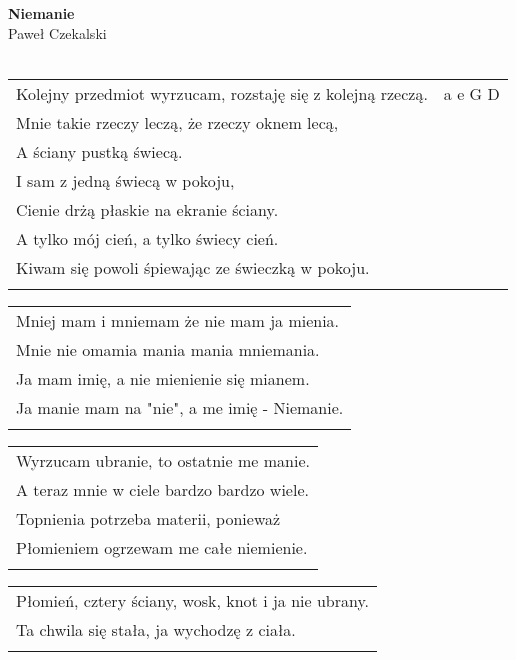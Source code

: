 \documentclass[a5paper]{article}
\begin{document}


\noindent
\fontsize{12pt}{15pt}\selectfont
\textbf{Niemanie} \\
\fontsize{8pt}{10pt}\selectfont
Paweł Czekalski \\ \\
\fontsize{10pt}{12pt}\selectfont
{}
\begin{tabular}{@{}p{9.5cm}p{2cm}@{}}
\noindent
Kolejny przedmiot wyrzucam, rozstaję się z kolejną rzeczą. & a e G D \\
Mnie takie rzeczy leczą, że rzeczy oknem lecą, \\
A ściany pustką świecą. \\
I sam z jedną świecą w pokoju, \\
Cienie drżą płaskie na ekranie ściany. \\
A tylko mój cień, a tylko świecy cień. \\
Kiwam się powoli śpiewając ze świeczką w pokoju.\\ \\
\end{tabular}

\noindent
\begin{tabular}{@{}p{12cm}@{}}
Mniej mam i mniemam że nie mam ja mienia. \\
Mnie nie omamia mania mania mniemania. \\
Ja mam imię, a nie mienienie się mianem. \\
Ja manie mam na "nie", a me imię - Niemanie. \\ \\
\end{tabular}

\noindent
\begin{tabular}{@{}p{12cm}@{}}
Wyrzucam ubranie, to ostatnie me manie. \\
A teraz mnie w ciele bardzo bardzo wiele. \\
Topnienia potrzeba materii, ponieważ \\
Płomieniem ogrzewam me całe niemienie. \\ \\
\end{tabular}

\noindent
\begin{tabular}{@{}p{12cm}@{}}
Płomień, cztery ściany, wosk, knot i ja nie ubrany. \\
Ta chwila się stała, ja wychodzę z ciała. \\ \\
\end{tabular}
\end{document}
